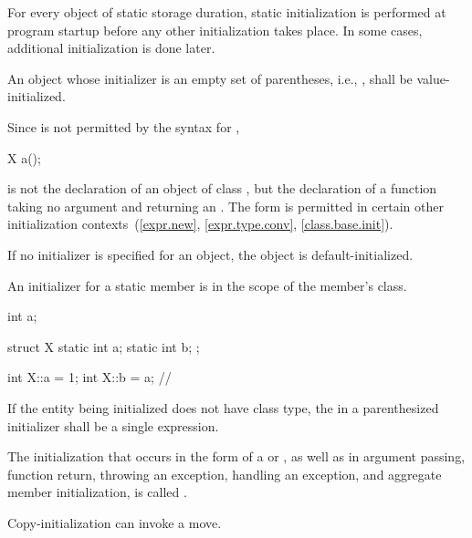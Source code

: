\pnum
\begin{note}
For every object of static storage duration,
static initialization is performed
at program startup before any other initialization takes place.
In some cases, additional initialization is done later.
\end{note}

\pnum
An object whose initializer is an empty set of parentheses, i.e.,
\tcode{()},
shall be
value-initialized.

%
\begin{note}
Since
\tcode{()}
is not permitted by the syntax for
,
\begin{codeblock}
X a();
\end{codeblock}
is not the declaration of an object of class
,
but the declaration of a function taking no argument and returning an
.
The form
\tcode{()}
is permitted in certain other initialization contexts~(\ref{expr.new},
\ref{expr.type.conv}, \ref{class.base.init}).
\end{note}

\pnum
If no initializer is specified for an object, the object is default-initialized.

\pnum
{}%
An initializer for a static member is in the scope of the member's class.
\begin{example}
\begin{codeblock}
int a;

struct X {
  static int a;
  static int b;
};

int X::a = 1;
int X::b = a;                   // 
\end{codeblock}
\end{example}

\pnum
If the entity being initialized does not have class type, the
 in a
parenthesized initializer shall be a single expression.

\pnum
{}%
%
The initialization that occurs in the \tcode{=} form of a
 or
,
as well as in argument passing, function return,
throwing an exception,
handling an exception,
and aggregate member initialization,
is called
.
\begin{note}
Copy-initialization can invoke a move.
\end{note}

